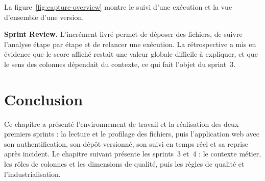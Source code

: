 
La figure~\ref{fig:capture-overview} montre le suivi d'une exécution et la vue d'ensemble d'une version.


\noindent\textbf{Sprint Review.} L'incrément livré permet de déposer des fichiers, de suivre l'analyse étape par étape et de relancer une exécution. La rétrospective a mis en évidence que le score affiché restait une valeur globale difficile à expliquer, et que le sens des colonnes dépendait du contexte, ce qui fait l'objet du sprint~3.

\section*{Conclusion}
Ce chapitre a présenté l'environnement de travail et la réalisation des deux premiers sprints : la lecture et le profilage des fichiers, puis l'application web avec son authentification, son dépôt versionné, son suivi en temps réel et sa reprise après incident. Le chapitre suivant présente les sprints~3 et~4 : le contexte métier, les rôles de colonnes et les dimensions de qualité, puis les règles de qualité et l'industrialisation.
